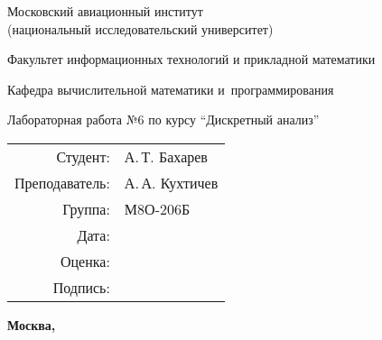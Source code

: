 \documentclass[pdf, unicode, 12pt, a4paper,oneside,fleqn]{article}
\begin{document}
\begin{center}
\bfseries

{\Large Московский авиационный институт\\ (национальный исследовательский университет)

}

\vspace{48pt}

{\large Факультет информационных технологий и прикладной математики
}

\vspace{36pt}


{\large Кафедра вычислительной математики и~программирования

}


\vspace{48pt}

Лабораторная работа №6 по курсу \enquote{Дискретный анализ}

\end{center}

\vspace{72pt}

\begin{flushright}
\begin{tabular}{rl}
Студент: & А.\,Т. Бахарев\\
Преподаватель: & А.\,А. Кухтичев \\
Группа: & М8О-206Б \\
Дата: & \\
Оценка: & \\
Подпись: & \\
\end{tabular}
\end{flushright}

\vfill
\pagestyle{empty}
\begin{center}
\bfseries
Москва, \the\year
\end{center}
\pagebreak
\end{document}
